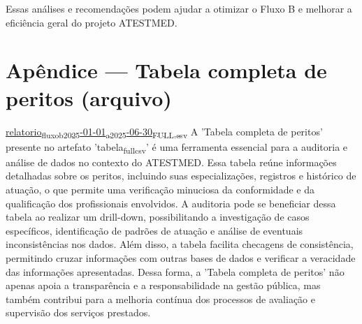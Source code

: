 \documentclass[11pt]{article}
\begin{document}
Essas análises e recomendações podem ajudar a otimizar o Fluxo B e melhorar a eficiência geral do projeto ATESTMED.

\section{Apêndice — Tabela completa de peritos (arquivo)}
\label{sec:org078f271}
\href{file:///home/gustavodetarso/Documentos/atestmed-defender/graphs\_and\_tables/exports/relatorio\_fluxo\_b\_2025-01-01\_a\_2025-06-30\_FULL.csv}{relatorio\textsubscript{fluxo}\textsubscript{b}\textsubscript{2025}-01-01\textsubscript{a}\textsubscript{2025}-06-30\textsubscript{FULL.csv}}
A 'Tabela completa de peritos' presente no artefato 'tabela\textsubscript{full}\textsubscript{csv}' é uma ferramenta essencial para a auditoria e análise de dados no contexto do ATESTMED. Essa tabela reúne informações detalhadas sobre os peritos, incluindo suas especializações, registros e histórico de atuação, o que permite uma verificação minuciosa da conformidade e da qualificação dos profissionais envolvidos. A auditoria pode se beneficiar dessa tabela ao realizar um drill-down, possibilitando a investigação de casos específicos, identificação de padrões de atuação e análise de eventuais inconsistências nos dados. Além disso, a tabela facilita checagens de consistência, permitindo cruzar informações com outras bases de dados e verificar a veracidade das informações apresentadas. Dessa forma, a 'Tabela completa de peritos' não apenas apoia a transparência e a responsabilidade na gestão pública, mas também contribui para a melhoria contínua dos processos de avaliação e supervisão dos serviços prestados.
\end{document}
